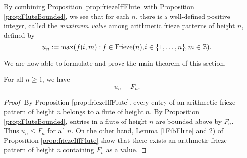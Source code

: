 By combining Proposition \ref{prop:friezeIffFlute} with Proposition \ref{prop:FluteBounded}, we see that 
for each $n$, there is a well-defined positive integer, called the {\it maximum value} among arithmetic frieze patterns of height $n$, defined by
    \[
        u_n := \max ( f (i,m) : f \in  {\rm Frieze}(n), i \in \{1,\ldots, n\}, m \in \mathbb{Z}).
    \]



We are now able to formulate and prove the main theorem of this section.
\begin{theorem}
    \label{mainTheorem}
    \leanok
    For all $n \geq 1$, we have 
    \[
        u_n = F_{n}.
    \]    
\end{theorem}
\begin{proof}\leanok
    By Proposition \ref{prop:friezeIffFlute}, every entry of an arithmetic frieze pattern of height $n$ belongs to a flute of height $n$.
    By Proposition \ref{prop:FluteBounded}, entries in a flute of height $n$ are bounded above by $F_n$. Thus $u_n \leq F_n$ for all $n$. 
On the other hand, Lemma \ref{l:FibFlute} and 2) of Proposition \ref{prop:friezeIffFlute} show that 
there exists an arithmetic frieze pattern of height $n$ containing $F_n$ as a value.
\end{proof}
